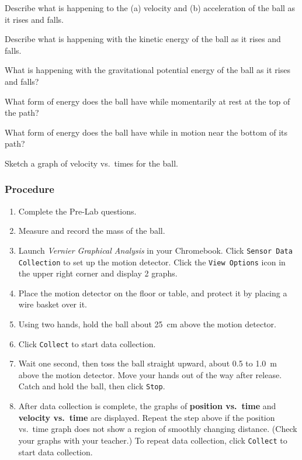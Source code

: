 \documentclass{article}
\begin{document}
\begin{exercise}
    Describe what is happening to the (a) velocity and (b) acceleration of the ball as it rises and falls.
\end{exercise}

\begin{exercise}
    Describe what is happening with the kinetic energy of the ball as it rises and falls.
\end{exercise}

\begin{exercise}
    What is happening with the gravitational potential energy of the ball as it rises and falls?
\end{exercise}

\begin{exercise}
    What form of energy does the ball have while momentarily at rest at the top of the path?
\end{exercise}

\begin{exercise}
    What form of energy does the ball have while in motion near the bottom of its path?
\end{exercise}

\begin{exercise}
    Sketch a graph of velocity vs.~times for the ball. 
\end{exercise}

\subsubsection*{Procedure}

\begin{enumerate}
\setlength\itemsep{-1ex}
    \item Complete the Pre-Lab questions.
    \item Measure and record the mass of the ball. 
    \item Launch \textit{Vernier Graphical Analysis} in your Chromebook. Click \texttt{Sensor Data Collection} to set up the motion detector. Click the \texttt{View Options} icon in the upper right corner and display 2 graphs.
    \item Place the motion detector on the floor or table, and protect it by placing a wire basket over it. 
    \item Using two hands, hold the ball about \SI{25}{cm} above the motion detector. 
    \item Click \texttt{Collect} to start data collection.
    \item Wait one second, then toss the ball straight upward, about 0.5 to \SI{1.0}{m} above the motion detector. Move your hands out of the way after release. Catch and hold the ball, then click \texttt{Stop}.
    \item After data collection is complete, the graphs of \textbf{position vs.~time} and \textbf{velocity vs.~time} are displayed. Repeat the step above if the position vs.~time graph does not show a region of smoothly changing distance. (Check your graphs with your teacher.) To repeat data collection, click \texttt{Collect} to start data collection.
\end{enumerate}
\end{document}
